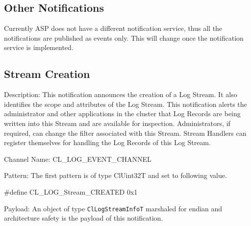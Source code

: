 \begin{flushleft}
\section{Other Notifications}
Currently ASP does not have a different notification service, thus all the notifications are published as events only. This will change once the 
notification service is implemented.


\subsection{Stream Creation}
\begin{Desc}
\item[Description:]
This notification announces the creation of a Log Stream. It also identifies the scope and attributes of the Log Stream. This notification alerts 
the administrator and other applications in the cluster that Log Records are being written into this Stream and are available for inspection. Administrators,
if required, can change the filter associated with this Stream. Stream Handlers can register themselves for handling the Log Records of this Log Stream.
\end{Desc}
\begin{Desc}
\item[Channel Name:]
CL\_\-LOG\_\-EVENT\_\-CHANNEL
\end{Desc}
\begin{Desc}
\item[Pattern:]
The first pattern is of type ClUint32T and set to following value.\par
\#define CL\_\-LOG\_\-Stream\_\-CREATED	0x1
\end{Desc}
\begin{Desc}
\item[Payload:]
An object of type {\tt{ClLogStreamInfoT}} marshaled for endian and architecture safety is the payload of this notification.
\end{Desc}



\end{flushleft}
